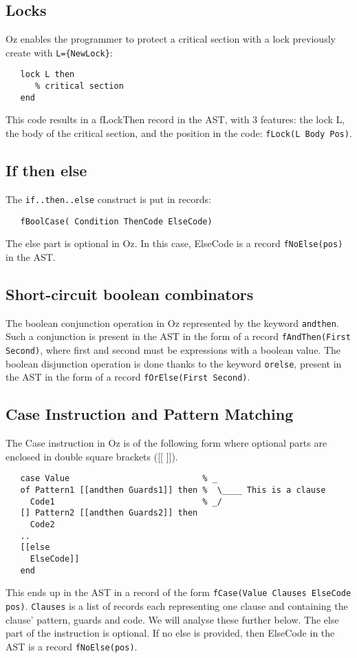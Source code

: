 \documentclass[a4paper]{memoir}
\begin{document}
\subsection{Locks}\label{sec:input:locks}
Oz enables the programmer to protect a critical section with a lock previously create with \lstinline!L={NewLock}!:
\begin{lstlisting}
   lock L then
      % critical section
   end
\end{lstlisting}

This code results in a fLockThen record in the AST, with 3 features: the lock L,
the body of the critical section, and the position in the code:
\lstinline!fLock(L Body Pos)!.

\subsection{If then else}
The \lstinline!if..then..else! construct is put in records:
\begin{lstlisting}
   fBoolCase( Condition ThenCode ElseCode)
\end{lstlisting}
The else part is optional in Oz. In this case, ElseCode is a record \lstinline!fNoElse(pos)! in the AST.

\subsection{Short-circuit boolean combinators}\label{sec:input:booleancombinations}
The boolean conjunction operation in Oz represented by the keyword \lstinline!andthen!. Such a conjunction is present in the AST in the form of a record \lstinline!fAndThen(First Second)!, where first and second must be expressions with a boolean value.
The boolean disjunction operation is done thanks to the keyword \lstinline!orelse!, present in the AST in the form of a record \lstinline!fOrElse(First Second)!.

\subsection{Case Instruction and Pattern Matching}\label{sec:input:patternmatching}
The Case instruction in Oz is of the following form where optional parts are enclosed in double square brackets ([[ ]]).
\begin{lstlisting}
   case Value                           % _
   of Pattern1 [[andthen Guards1]] then %  \____ This is a clause
     Code1                              % _/
   [] Pattern2 [[andthen Guards2]] then
     Code2
   ..
   [[else
     ElseCode]]
   end
\end{lstlisting}
This ends up in the AST in a record of the form \lstinline!fCase(Value Clauses ElseCode pos)!.
\lstinline!Clauses! is a list of records each representing one clause and containing the clause' pattern, guards and code. We will analyse these further below.
The else part of the instruction is optional. If no else is provided, then ElseCode in the AST is a record \lstinline!fNoElse(pos)!.
\end{document}
